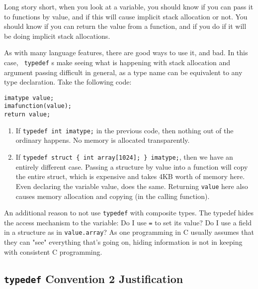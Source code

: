 \documentclass[11pt,onecolumn]{article}
\newcommand{\head}[1]{\vspace{0.4em}\noindent{\bf #1}}
\begin{document}
    Long story short, when you look at a variable, you should know if
    you can pass it to functions by value, and if this will cause
    implicit stack allocation or not.  You should know if you can
    return the value from a function, and if you do if it will be
    doing implicit stack allocations.

    \head{{\tt typedef}s gone wrong.}  As with many language features,
    there are good ways to use it, and bad.  In this case, {\tt
      typedef} s make seeing what is happening with stack allocation
    and argument passing difficult in general, as a type name can be
    equivalent to any type declaration.  Take the following code:

    \begin{minipage}{3in}
      \footnotesize
      \lstset{language=C}
      \begin{lstlisting}
imatype value;
imafunction(value);
return value;
      \end{lstlisting}
    \end{minipage}

    \begin{enumerate}[itemsep=0pt,topsep=1pt,parsep=1pt,leftmargin=1.5em]
    \item If {\tt typedef int imatype;} in the previous code, then
      nothing out of the ordinary happens.  No memory is allocated
      transparently.
    \item If {\tt typedef struct \{ int array[1024]; \} imatype;}, then we have
      an entirely different case.  Passing a structure by value into
      a function will copy the entire struct, which is expensive and
      takes 4KB worth of memory here.  Even declaring the variable
      value, does the same.  Returning {\tt value} here also causes
      memory allocation and copying (in the calling function).
    \end{enumerate}

    An additional reason to not use {\tt typedef} with composite
    types.  The typedef hides the access mechanism to the variable: Do
    I use {\tt =} to set its value?  Do I use a field in a structure
    as in {\tt value.array}?  As one programming in C usually assumes
    that they can "see" everything that's going on, hiding information
    is not in keeping with consistent C programming.

\subsection{{\tt typedef} Convention 2 Justification}
\end{document}
